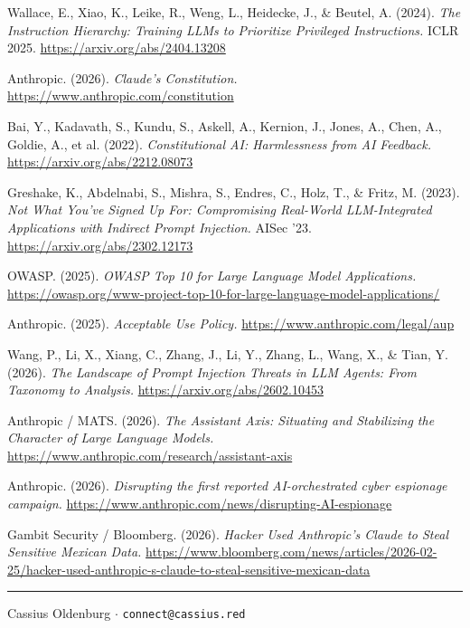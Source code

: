 \documentclass[11pt,a4paper]{article}
\begin{document}
\begin{enumerate}[label={[\arabic*]}]

\item Wallace, E., Xiao, K., Leike, R., Weng, L., Heidecke, J., \& Beutel, A. (2024). \textit{The Instruction Hierarchy: Training LLMs to Prioritize Privileged Instructions.} ICLR 2025. \url{https://arxiv.org/abs/2404.13208}

\item Anthropic. (2026). \textit{Claude's Constitution.} \url{https://www.anthropic.com/constitution}

\item Bai, Y., Kadavath, S., Kundu, S., Askell, A., Kernion, J., Jones, A., Chen, A., Goldie, A., et al. (2022). \textit{Constitutional AI: Harmlessness from AI Feedback.} \url{https://arxiv.org/abs/2212.08073}

\item Greshake, K., Abdelnabi, S., Mishra, S., Endres, C., Holz, T., \& Fritz, M. (2023). \textit{Not What You've Signed Up For: Compromising Real-World LLM-Integrated Applications with Indirect Prompt Injection.} AISec '23. \url{https://arxiv.org/abs/2302.12173}

\item OWASP. (2025). \textit{OWASP Top 10 for Large Language Model Applications.} \url{https://owasp.org/www-project-top-10-for-large-language-model-applications/}

\item Anthropic. (2025). \textit{Acceptable Use Policy.} \url{https://www.anthropic.com/legal/aup}

\item Wang, P., Li, X., Xiang, C., Zhang, J., Li, Y., Zhang, L., Wang, X., \& Tian, Y. (2026). \textit{The Landscape of Prompt Injection Threats in LLM Agents: From Taxonomy to Analysis.} \url{https://arxiv.org/abs/2602.10453}

\item Anthropic / MATS. (2026). \textit{The Assistant Axis: Situating and Stabilizing the Character of Large Language Models.} \url{https://www.anthropic.com/research/assistant-axis}

\item Anthropic. (2026). \textit{Disrupting the first reported AI-orchestrated cyber espionage campaign.} \url{https://www.anthropic.com/news/disrupting-AI-espionage}

\item Gambit Security / Bloomberg. (2026). \textit{Hacker Used Anthropic's Claude to Steal Sensitive Mexican Data.} \url{https://www.bloomberg.com/news/articles/2026-02-25/hacker-used-anthropic-s-claude-to-steal-sensitive-mexican-data}

\end{enumerate}

\vspace{1em}
\hrule
\vspace{0.5em}
\begin{center}
Cassius Oldenburg $\cdot$ \texttt{connect@cassius.red}
\end{center}
\end{document}
